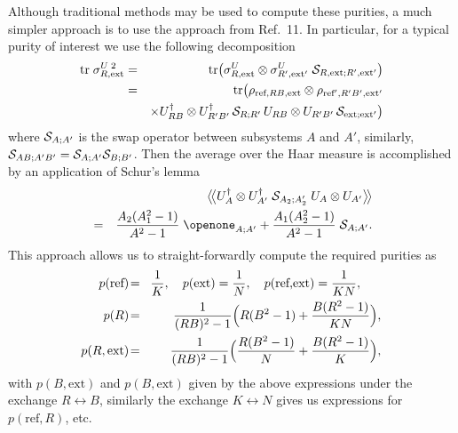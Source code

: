 \documentclass[twocolumn,aps,prl]{revtex4}
\begin{document}
Although traditional methods \cite{ap2} may be used to compute these
purities, a much simpler approach is to use the approach from
Ref.~11. In particular, for a typical purity of interest
we use the following decomposition
\begin{eqnarray}
\text{tr}\; \sigma_{R,\text{ext}}^{U\;2}
&=& \text{tr} \bigl( \sigma_{R,\text{ext}}^U
\otimes \sigma_{R',\text{ext}'}^U \;
{\cal S}_{R,\text{ext};R',\text{ext}'}\bigr)\\
&=& \text{tr} \bigl( \rho_{\text{ref},RB,\text{ext}}\otimes
\rho_{\text{ref}',R'B',\text{ext}'}\nonumber\\
&&\times U_{RB}^\dagger\otimes U_{R'B'}^\dagger\,
{\cal S}_{R;R'}\, U_{RB}\otimes U_{R'B'}\,
{\cal S}_{\text{ext};\text{ext}'} \bigr) \nonumber
\end{eqnarray}
where ${\cal S}_{A;A'}$ is the swap operator between 
subsystems $A$ and $A'$, similarly,
${\cal S}_{AB;A'B'}={\cal S}_{A;A'}{\cal S}_{B;B'}$. Then the average
over the Haar measure is accomplished by an application of Schur's
lemma \cite{Abey06}
\begin{eqnarray}
&&\bigl\langle\!\bigl\langle U_A^\dagger\otimes U_{A'}^\dagger\;
{\cal S}_{A_2;A_2'}\; U_A \otimes U_{A'}\bigr\rangle\!\bigr\rangle
\nonumber \\
&=&\frac{A_2(A_1^2-1)}{A^2-1}\;\openone_{A;A'}
+\frac{A_1(A_2^2-1)}{A^2-1}\;{\cal S}_{A;A'}.
\end{eqnarray}
This approach allows us to straight-forwardly compute the required
purities as
\begin{eqnarray}
p(\text{ref})\!&=&\!\frac{1}{K},\quad
p(\text{ext})=\frac{1}{N},\quad
p(\text{ref,ext})=\frac{1}{KN},~~~~~ \nonumber \\
p(R)\!&=&\!\frac{1}{(RB)^2-1}
\Bigl( R(B^2-1)+\frac{B(R^2-1)}{KN}\Bigr), \label{HJS} \\ %
p(R,\text{ext})\!&=&\!\frac{1}{(RB)^2-1}
\Bigl( \frac{R(B^2-1)}{N}+\frac{B(R^2-1)}{K}\Bigr), \nonumber
\end{eqnarray}
with $p(B,\text{ext})$ and $p(B,\text{ext})$ given by the
above expressions under the exchange $R\leftrightarrow B$, similarly
the exchange $K\leftrightarrow N$ gives us expressions for
$p(\text{ref},R)$, etc.
\end{document}

